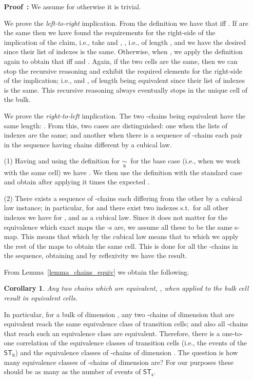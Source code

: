 \documentclass[submission,copyright,creativecommons]{eptcs}
\newtheorem{corollary}[theorem]{Corollary}
\newenvironment{proof}[1][\!\!\,]{\vspace{1ex}\noindent\textbf{Proof #1: }}{\hfill\vspace{2ex}}
\newcounter{case}
\newcommand\sculpintost{\ensuremath{\mathsf{ST}_{\!\mathsf{s}}}}
\newcommand\hintostScultures{\ensuremath{\mathsf{ST}_{\!\mathsf{b}}}}
\newcommand\cellEquivBulk{\ensuremath{\underset{\mathsf{b}}{\sim}}}
\begin{document}
\begin{proof}
We assume  for otherwise it is trivial.

We prove the \textit{left-to-right} implication.
From the definition we have that  iff 
.
If  are the same then we have found the requirements for the right-side of the implication of the claim, i.e., take  and , , i.e., of length , and we have the desired  since their list of indexes is the same.
Otherwise, when , we apply the definition again to obtain that  iff  
 and 
.
Again, if the two cells are the same,  then we can stop the recursive reasoning and exhibit the required elements for the right-side of the implication; i.e.,  and ,  of length  being equivalent  since their list of indexes is the same.
This recursive reasoning always eventually stops in the unique cell  of the bulk.

We prove the \textit{right-to-left} implication.
The two -chains being equivalent have the same length: . From this, two cases are distinguished: one when the lists of indexes are the same; and another when there is a sequence of -chains each pair in the sequence having chains different by a cubical law.

(1) Having  and  using the definition for \cellEquivBulk\ for the base case (i.e., when we work with the same cell) we have . We then use the definition with the standard case and obtain after applying it  times the expected .

(2) There exists a sequence of -chains  each differing from the other by a cubical law instance; in particular, for  and  there exist two indexes  s.t.\ for all other indexes we have  for , and  as a cubical law. Since it does not matter for the equivalence which exact maps the -s are, we assume all these to be the same s-map.
This means that  which by the cubical law means that  to which we apply the rest of the maps to obtain the same cell. This is done for all the -chains in the sequence, obtaining  and by reflexivity we have the result.
\end{proof}


From Lemma~\ref{lemma_chains_equiv} we obtain the following.

\begin{corollary}
Any two chains which are equivalent, , when applied to the bulk cell  result in equivalent cells. 
\end{corollary}

In particular, for a bulk of dimension , any two -chains of dimension  that are equivalent reach the same equivalence class of  transition cells; and also all -chains that reach such an equivalence class are equivalent. Therefore, there is a one-to-one correlation of the equivalence classes of transition cells (i.e., the events of the \hintostScultures) and the equivalence classes of -chains of dimension .
The question is how many equivalence classes of -chains of dimension  are? For our purposes these should be as many as the number of events of \sculpintost.
\end{document}

